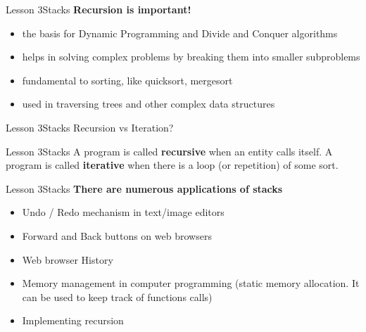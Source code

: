 \documentclass[aspectratio=1610]{beamer}
\begin{document}
\begin{frame}{Lesson 3}{Stacks}
\LARGE
\textbf{Recursion is important!}\\
\begin{itemize}
    \item the basis for Dynamic Programming and Divide and Conquer algorithms
    \item helps in solving complex problems by breaking them into smaller subproblems
    \item fundamental to sorting, like quicksort, mergesort
    \item used in traversing trees and other complex data structures
\end{itemize}
\end{frame}



\begin{frame}{Lesson 3}{Stacks}
\Huge
Recursion vs Iteration?
\end{frame}


\begin{frame}{Lesson 3}{Stacks}
\huge
A program is called \textbf{recursive} when an entity calls itself.
A program is called \textbf{iterative} when there is a loop (or
repetition) of some sort.
\end{frame}







\begin{frame}{Lesson 3}{Stacks}
\LARGE
\textbf{There are numerous applications of stacks}\\
\begin{itemize}
    \item Undo / Redo mechanism in text/image editors
    \item Forward and Back buttons on web browsers
    \item Web browser History
    \item Memory management in computer programming (static memory allocation. It can be used to keep track of functions calls)
    \item Implementing recursion
\end{itemize}
\end{frame}
\end{document}
